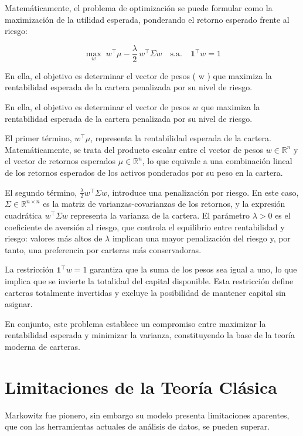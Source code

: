 Matemáticamente, el problema de optimización se puede formular como la maximización de la utilidad esperada, ponderando el retorno esperado frente al riesgo:

\begin{equation} 
\max_{w} \; w^\top \mu - \frac{\lambda}{2} \, w^\top \Sigma w 
\quad \text{s.a.} \quad \mathbf{1}^\top w = 1
\end{equation}

En ella, el objetivo es determinar el vector de pesos ( w ) que maximiza la rentabilidad esperada de la cartera penalizada por su nivel de riesgo.

En ella, el objetivo es determinar el vector de pesos $w$ que maximiza la rentabilidad esperada de la cartera penalizada por su nivel de riesgo.

El primer término, $w^\top \mu$, representa la rentabilidad esperada de la cartera. Matemáticamente, se trata del producto escalar entre el vector de pesos $w \in \mathbb{R}^n$ y el vector de retornos esperados $\mu \in \mathbb{R}^n$, lo que equivale a una combinación lineal de los retornos esperados de los activos ponderados por su peso en la cartera.

El segundo término, $\frac{\lambda}{2} w^\top \Sigma w$, introduce una penalización por riesgo. En este caso, $\Sigma \in \mathbb{R}^{n \times n}$ es la matriz de varianzas-covarianzas de los retornos, y la expresión cuadrática $w^\top \Sigma w$ representa la varianza de la cartera. El parámetro $\lambda > 0$ es el coeficiente de aversión al riesgo, que controla el equilibrio entre rentabilidad y riesgo: valores más altos de $\lambda$ implican una mayor penalización del riesgo y, por tanto, una preferencia por carteras más conservadoras.

La restricción $\mathbf{1}^\top w = 1$ garantiza que la suma de los pesos sea igual a uno, lo que implica que se invierte la totalidad del capital disponible. Esta restricción define carteras totalmente invertidas y excluye la posibilidad de mantener capital sin asignar.

En conjunto, este problema establece un compromiso entre maximizar la rentabilidad esperada y minimizar la varianza, constituyendo la base de la teoría moderna de carteras.

\section{Limitaciones de la Teoría Clásica}
Markowitz fue pionero, sin embargo su modelo presenta limitaciones aparentes, que con las herramientas actuales de análisis de datos, se pueden superar. 

